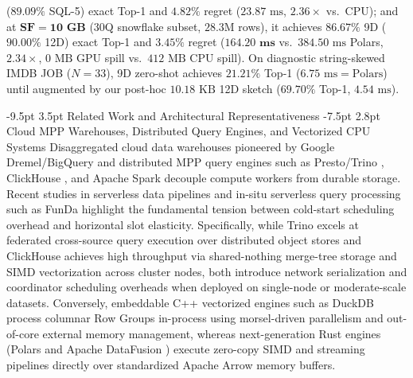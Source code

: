\documentclass[10pt,a4paper]{article}
\makeatletter
\renewcommand\section{\@startsection{section}{1}{\z@}%
  {-9.5pt \@plus -2pt \@minus -1.5pt}%
  {3.5pt \@plus 1pt}%
  {\normalfont\large\bfseries}}
\renewcommand\subsection{\@startsection{subsection}{2}{\z@}%
  {-7.5pt \@plus -2pt \@minus -1pt}%
  {2.8pt \@plus 1pt}%
  {\normalfont\normalsize\bfseries}}
\makeatother
\begin{document}
\begin{enumerate}[leftmargin=1.5em,itemsep=3pt]
($\mathbf{89.09\%}$ SQL-5) exact Top-1 and $4.82\%$ regret ($23.87\text{ ms}$, $2.36\times$ vs.\ CPU); and at $\mathbf{\text{SF}=10\text{ GB}}$ ($30$Q snowflake subset, $28.3\text{M}$ rows), it achieves $\mathbf{86.67\%}$ 9D ($\mathbf{90.00\%}$ 12D) exact Top-1 and $3.45\%$ regret ($\mathbf{164.20\text{ ms}}$ vs.\ $384.50\text{ ms}$ Polars, $\mathbf{2.34\times}$, $0\text{ MB}$ GPU spill vs.\ $412\text{ MB}$ CPU spill). On diagnostic string-skewed IMDB JOB ($N=33$), 9D zero-shot achieves $21.21\%$ Top-1 ($6.75\text{ ms} = \text{Polars}$) until augmented by our post-hoc $10.18\text{ KB}$ 12D sketch ($69.70\%$ Top-1, $4.54\text{ ms}$).
\end{enumerate}

\label{tab:key_findings_glance}\label{tab:jbd_glance_1a}%

\section{Related Work and Architectural Representativeness}
\subsection{Cloud MPP Warehouses, Distributed Query Engines, and Vectorized CPU Systems}
Disaggregated cloud data warehouses pioneered by Google Dremel/BigQuery \cite{melnik2010dremel, melnik2020dremel} and distributed MPP query engines such as Presto/Trino \cite{sethi2019presto}, ClickHouse \cite{schulze2024clickhouse}, and Apache Spark \cite{ahmed2020hibench} decouple compute workers from durable storage. Recent studies in serverless data pipelines \cite{shojaee2024serverless} and in-situ serverless query processing such as FunDa \cite{lounissi2025funda} highlight the fundamental tension between cold-start scheduling overhead and horizontal slot elasticity. Specifically, while Trino \cite{sethi2019presto} excels at federated cross-source query execution over distributed object stores and ClickHouse \cite{schulze2024clickhouse} achieves high throughput via shared-nothing merge-tree storage and SIMD vectorization across cluster nodes, both introduce network serialization and coordinator scheduling overheads when deployed on single-node or moderate-scale datasets. Conversely, embeddable C++ vectorized engines such as DuckDB \cite{raasveldt2019duckdb, kuiper2024duckdb_ooc} process columnar Row Groups in-process using morsel-driven parallelism and out-of-core external memory management, whereas next-generation Rust engines (Polars and Apache DataFusion \cite{lamb2024datafusion}) execute zero-copy SIMD and streaming pipelines directly over standardized Apache Arrow memory buffers.
\end{document}
